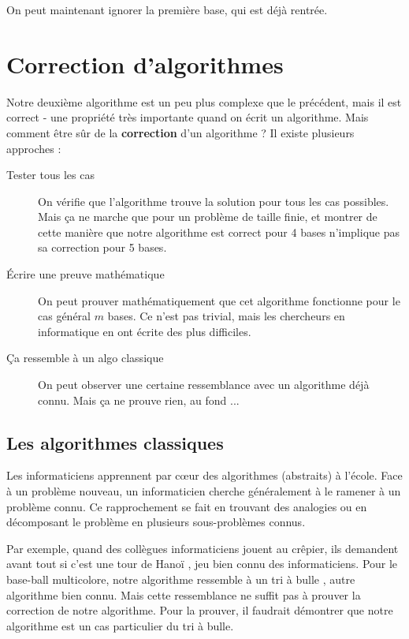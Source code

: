 \documentclass[a5paper,pagesize,DIV=14]{scrbook}
\begin{document}
On peut maintenant ignorer la première base, qui est déjà rentrée.

\section*{Correction d'algorithmes}

Notre deuxième algorithme est un peu plus complexe que le précédent, mais il est correct - une propriété très importante quand on écrit un algorithme. Mais comment être sûr de la \textbf{correction} d'un algorithme ? Il existe plusieurs approches :

\begin{description}
  \item[Tester tous les cas] On vérifie que l'algorithme trouve la solution pour tous les cas possibles. Mais ça ne marche que pour un problème de taille finie, et montrer de cette manière que notre algorithme est correct pour 4 bases n'implique pas sa correction pour 5 bases.
  \item[Écrire une preuve mathématique] On peut prouver mathématiquement que cet algorithme fonctionne pour le cas général $m$ bases. Ce n'est pas trivial, mais les chercheurs en informatique en ont écrite des plus difficiles.
  \item[Ça ressemble à un algo classique] On peut observer une certaine ressemblance avec un algorithme déjà connu. Mais ça ne prouve rien, au fond ...
\end{description}

\subsection*{Les algorithmes classiques}

Les informaticiens apprennent par c\oe{}ur des algorithmes (abstraits) à l'école. Face à un problème nouveau, un informaticien cherche généralement à le ramener à un problème connu. Ce rapprochement se fait en trouvant des analogies ou en décomposant le problème en plusieurs sous-problèmes connus.

Par exemple, quand des collègues informaticiens jouent au crêpier, ils demandent avant tout si c'est \og une tour de Hanoï \fg, jeu bien connu des informaticiens. Pour le base-ball multicolore, notre algorithme ressemble à un \og tri à bulle \fg, autre algorithme bien connu. Mais cette ressemblance ne suffit pas à prouver la correction de notre algorithme. Pour la prouver, il faudrait démontrer que notre algorithme est un cas particulier du tri à bulle.
 
\end{document}

